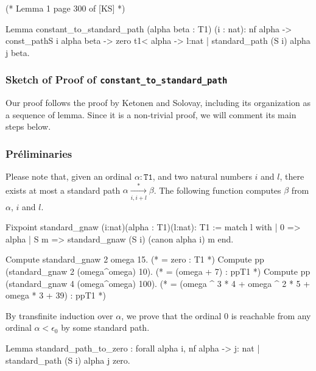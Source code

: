 \begin{Coqsrc}
(* Lemma 1 page 300 of [KS] *)

Lemma constant_to_standard_path 
  (alpha beta : T1) (i : nat):
  nf alpha -> const_pathS i alpha beta -> zero  t1< alpha ->
  {l:nat | standard_path (S i) alpha j beta}.
\end{Coqsrc}

 

\subsubsection{Sketch of Proof of \texttt{constant\_to\_standard\_path}}

Our proof follows the proof by Ketonen and Solovay, including its organization as a sequence of lemma.  Since it is a non-trivial proof, we will comment its main steps below.

\subsubsection*{Préliminaries}


Please note that, given an ordinal $\alpha:\texttt{T1}$, and two natural numbers $i$ and $l$, there exists at most a standard path $\alpha \xrightarrow [i,i+l]{*} \beta$.
The following function computes $\beta$ from $\alpha$, $i$ and $l$.

\begin{Coqsrc}
Fixpoint standard_gnaw (i:nat)(alpha : T1)(l:nat):  T1  :=
  match l with
  | 0 => alpha
  | S m => standard_gnaw (S i) (canon alpha i) m
  end.
\end{Coqsrc}

\begin{Coqsrc}
  Compute standard_gnaw 2 omega 15.
(*   = zero
     : T1 *)
Compute pp (standard_gnaw 2 (omega^omega)  10).
(*
= (omega + 7)%
     : ppT1
*)
Compute pp (standard_gnaw 4 (omega^omega)  100).
(*
 = (omega ^ 3 * 4 + omega ^ 2 * 5 + omega * 3 + 39)%
     : ppT1 *)
\end{Coqsrc}


By transfinite induction over  $\alpha$, we prove that the ordinal $0$ is reachable from any ordinal $\alpha<\epsilon_0$ by some standard path.


\begin{Coqsrc}
Lemma standard_path_to_zero :
  forall  alpha i, nf alpha ->
                   {j: nat | standard_path (S i) alpha j zero}.
\end{Coqsrc}

